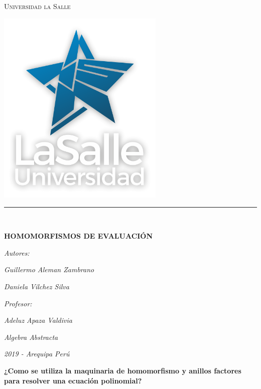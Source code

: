 \documentclass[a4paper,12pt]{article}
\begin{document}
\begin{titlepage}
\pagestyle{fancy}
	\centering

	{\scshape\LARGE Universidad la Salle \par}
	\includegraphics[width=0.6\textwidth]{Estrella}\par

	\rule{80mm}{0.1mm}\\
	{\huge\bfseries HOMOMORFISMOS DE EVALUACIÓN\par}
	{\Large\itshape Autores:\par}
	{\Large\itshape Guillermo Aleman Zambrano\par}
	{\Large\itshape Daniela Vilchez Silva\par}
	\vfill
	\par
	{\Large\itshape Profesor:\par}
	{\Large\itshape Adeluz Apaza Valdivia \par}
	{\Large\itshape Algebra Abstracta\par}
	\vfill
	\vspace{2cm}
	{\Large\itshape 2019 - Arequipa Perú\par}

	\vfill

\end{titlepage}


\textbf{¿Como se utiliza la maquinaria de homomorfismo y anillos factores para
resolver una ecuación polinomial?}
\end{document}
